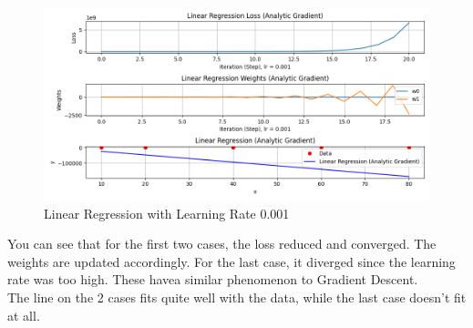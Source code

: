 \documentclass{article}
\begin{document}
\begin{figure}[ht]
  \centering
  \includegraphics[width=1\textwidth]{images/lab2/linear_regression_(0.001).png}
  \caption{Linear Regression with Learning Rate 0.001}
  \label{fig:lr_0.001}
\end{figure}
\newpage
\noindent You can see that for the first two cases, the loss reduced and converged. The weights are updated accordingly. For the last case, it diverged since the learning rate was too high. These havea  similar phenomenon to Gradient Descent.\\
\noindent The line on the 2 cases fits quite well with the data, while the last case doesn't fit at all.
\end{document}
